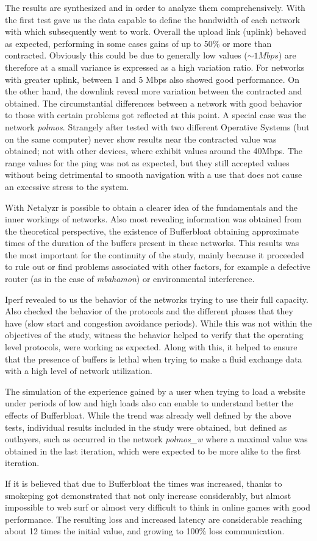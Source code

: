 The results are synthesized and in order to analyze them comprehensively. With
the first test gave us the data capable to define the bandwidth of each
network with which subsequently went to work. Overall the upload link (uplink)
behaved as expected, performing in some cases gains of up to 50\% or more than
contracted. Obviously this could be due to generally low values ($\sim1Mbps$)
are therefore at a small variance is expressed as a high variation ratio. For
networks with greater uplink, between 1 and 5 Mbps also showed good
performance. On the other hand, the downlink reveal more variation between the
contracted and obtained. The circumstantial differences between a network with
good behavior to those with certain problems got reflected at this point. A
special case was the network \textit{polmos}. Strangely after tested with two
different Operative Systems (but on the same computer) never show results near
the contracted value was obtained; not with other devices, where exhibit
values around the 40Mbps. The range values for the ping was not as expected,
but they still accepted values without being detrimental to smooth navigation
with a use that does not cause an excessive stress to the system.

With Netalyzr is possible to obtain a clearer idea of the fundamentals and the
inner workings of networks. Also most revealing information was obtained from
the theoretical perspective, the existence of Bufferbloat obtaining
approximate times of the duration of the buffers present in these networks.
This results was the most important for the continuity of the study, mainly
because it proceeded to rule out or find problems associated with other
factors, for example a defective router (as in the case of \textit{mbahamon})
or environmental interference.

Iperf revealed to us the behavior of the networks trying to use their full
capacity. Also checked the behavior of the protocols and the different phases
that they have (slow start and congestion avoidance periods). While this was
not within the objectives of the study, witness the behavior helped to verify
that the operating level protocols, were working as expected. Along with this,
it helped to ensure that the presence of buffers is lethal when trying to make
a fluid exchange data with a high level of network utilization.

The simulation of the experience gained by a user when trying to load a
website under periods of low and high loads also can enable to understand
better the effects of Bufferbloat. While the trend was already well defined by
the above tests, individual results included in the study were obtained, but
defined as outlayers, such as occurred in the network \textit{polmos\_w} where
a maximal value was obtained in the last iteration, which were expected  to be
more alike to the first iteration.

If it is believed that due to Bufferbloat the times was increased, thanks to
smokeping got demonstrated that not only increase considerably, but almost
impossible to web surf or almost very difficult to think in online games with
good performance. The resulting loss and increased latency are considerable
reaching about 12 times the initial value, and growing to 100\% loss
communication.
